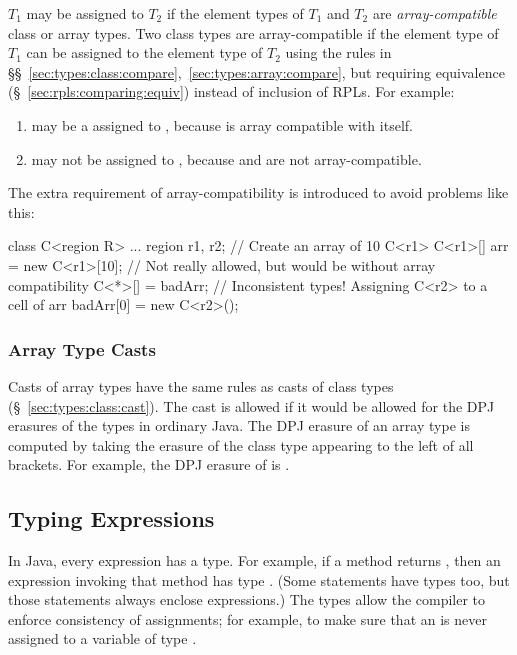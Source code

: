  $T_1$ may be
assigned to $T_2$ if the element types of $T_1$ and $T_2$ are
\emph{array-compatible} class or array types.  Two class types are
array-compatible if the element type of $T_1$ can be assigned to the
element type of $T_2$ using the rules in
\S\S~\ref{sec:types:class:compare},~\ref{sec:types:array:compare}, but
requiring equivalence (\S~\ref{sec:rpls:comparing:equiv}) instead of
inclusion of RPLs.  For example:
%
\begin{enumerate}
\item {} may be a assigned to , because
   is array compatible with itself.
\item {} may not be assigned to ,
  because  and  are not array-compatible.
\end{enumerate}
%
The extra requirement of array-compatibility is introduced to avoid
problems like this:
%
\begin{dpjlisting}
class C<region R> { ... }
region r1, r2;
// Create an array of 10 C<r1>
C<r1>[] arr = new C<r1>[10];
// Not really allowed, but would be without array compatibility
C<*>[] = badArr;
// Inconsistent types!  Assigning C<r2> to a cell of arr
badArr[0] = new C<r2>();
\end{dpjlisting}

\subsubsection{Array Type Casts%
\label{sec:types:array:cast}}

Casts of array types have the same rules as casts of class types
(\S~\ref{sec:types:class:cast}).  The cast is allowed if it would be
allowed for the DPJ erasures of the types in ordinary Java.  The DPJ
erasure of an array type is computed by taking the erasure of the
class type appearing to the left of all brackets.  For example, the
DPJ erasure of  is .

\subsection{Typing Expressions%
\label{sec:types:exp}}

In Java, every expression has a type.  For example, if a method
returns , then an expression invoking that method has type
.  (Some statements have types too, but those statements
always enclose expressions.)  The types allow the compiler to enforce
consistency of assignments; for example, to make sure that an
 is never assigned to a variable of type .

